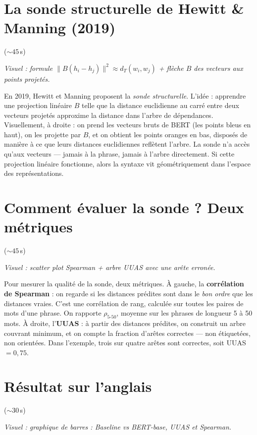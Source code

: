 \documentclass[11pt]{article}
\newcommand{\visuel}[1]{%
  {\footnotesize\color{midgray}\textit{Visuel : #1}\par\vspace{0.3em}}}
\newcommand{\duree}[1]{\hfill{\footnotesize\color{midgray}(${\sim}#1$\,s)}}
\begin{document}
\section{La sonde structurelle de Hewitt \& Manning (2019)} \duree{45}
\visuel{formule $\|B(h_i - h_j)\|^2 \approx d_T(w_i, w_j)$ +
        flèche $B$ des vecteurs aux points projetés.}

En 2019, Hewitt et Manning proposent la \emph{sonde structurelle}.
L'idée : apprendre une projection linéaire $B$ telle que la distance
euclidienne au carré entre deux vecteurs projetés approxime la
distance dans l'arbre de dépendances. Visuellement, à droite : on
prend les vecteurs bruts de BERT (les points bleus en haut), on les
projette par $B$, et on obtient les points oranges en bas, disposés
de manière à ce que leurs distances euclidiennes reflètent l'arbre.
La sonde n'a accès qu'aux vecteurs --- jamais à la phrase, jamais à
l'arbre directement. Si cette projection linéaire fonctionne, alors
la syntaxe vit géométriquement dans l'espace des représentations.

\section{Comment évaluer la sonde ? Deux métriques} \duree{45}
\visuel{scatter plot Spearman + arbre UUAS avec une arête erronée.}

Pour mesurer la qualité de la sonde, deux métriques. À gauche, la
\textbf{corrélation de Spearman} : on regarde si les distances
prédites sont dans le \emph{bon ordre} que les distances vraies.
C'est une corrélation de rang, calculée sur toutes les paires de
mots d'une phrase. On rapporte $\rho_{5\text{-}50}$, moyenne sur les
phrases de longueur 5 à 50 mots. À droite, l'\textbf{UUAS} : à
partir des distances prédites, on construit un arbre couvrant
minimum, et on compte la fraction d'arêtes correctes --- non
étiquetées, non orientées. Dans l'exemple, trois sur quatre arêtes
sont correctes, soit UUAS $= 0{,}75$.

\section{Résultat sur l'anglais} \duree{30}
\visuel{graphique de barres : Baseline vs BERT-base, UUAS et Spearman.}
\end{document}
